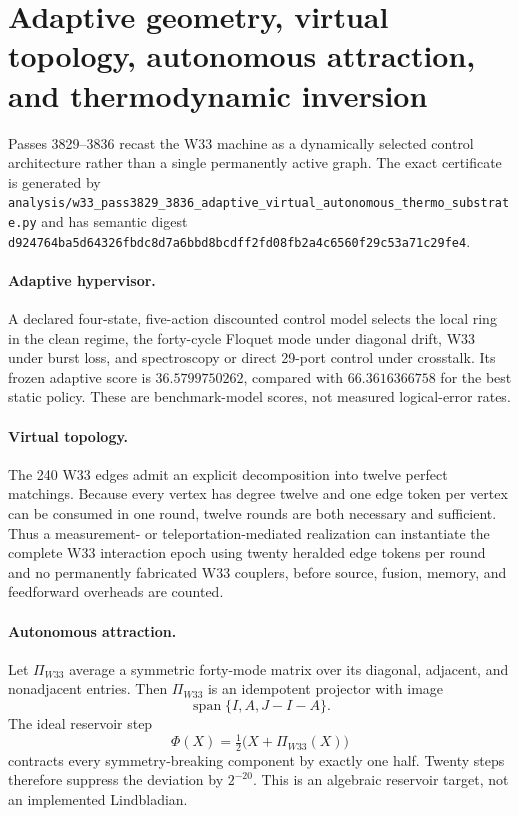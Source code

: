 \section{Adaptive geometry, virtual topology, autonomous attraction, and thermodynamic inversion}
\label{sec:bt3829-bt3836}

Passes 3829--3836 recast the W33 machine as a dynamically selected control architecture rather than a single permanently active graph.  The exact certificate is generated by
\texttt{analysis/w33\_pass3829\_3836\_adaptive\_virtual\_autonomous\_thermo\_substrate.py} and has semantic digest
\texttt{d924764ba5d64326fbdc8d7a6bbd8bcdff2fd08fb2a4c6560f29c53a71c29fe4}.

\paragraph{Adaptive hypervisor.}
A declared four-state, five-action discounted control model selects the local ring in the clean regime, the forty-cycle Floquet mode under diagonal drift, W33 under burst loss, and spectroscopy or direct 29-port control under crosstalk.  Its frozen adaptive score is $36.5799750262$, compared with $66.3616366758$ for the best static policy.  These are benchmark-model scores, not measured logical-error rates.

\paragraph{Virtual topology.}
The 240 W33 edges admit an explicit decomposition into twelve perfect matchings.  Because every vertex has degree twelve and one edge token per vertex can be consumed in one round, twelve rounds are both necessary and sufficient.  Thus a measurement- or teleportation-mediated realization can instantiate the complete W33 interaction epoch using twenty heralded edge tokens per round and no permanently fabricated W33 couplers, before source, fusion, memory, and feedforward overheads are counted.

\paragraph{Autonomous attraction.}
Let $\Pi_{W33}$ average a symmetric forty-mode matrix over its diagonal, adjacent, and nonadjacent entries.  Then $\Pi_{W33}$ is an idempotent projector with image
\[
\operatorname{span}\{I,A,J-I-A\}.
\]
The ideal reservoir step
\[
\Phi(X)=\tfrac12\bigl(X+\Pi_{W33}(X)\bigr)
\]
contracts every symmetry-breaking component by exactly one half.  Twenty steps therefore suppress the deviation by $2^{-20}$.  This is an algebraic reservoir target, not an implemented Lindbladian.

